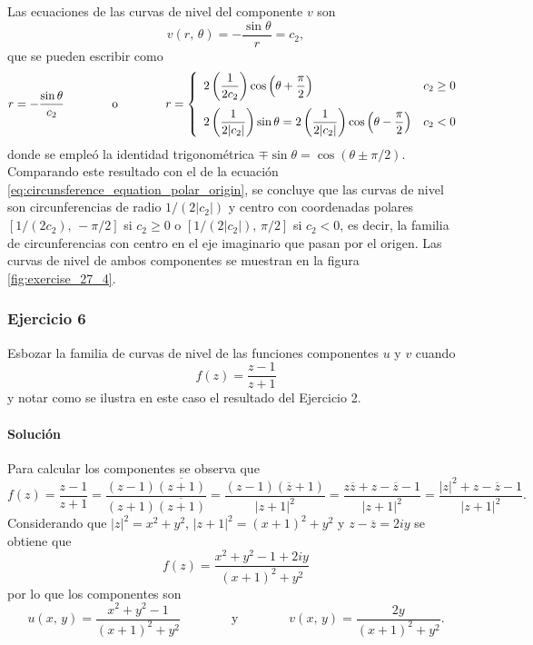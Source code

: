 \documentclass[a4paper]{report}
\begin{document}
Las ecuaciones de las curvas de nivel del componente \(v\) son
\[
 v(r,\,\theta)=-\frac{\sin\theta}{r}=c_2,
\]
que se pueden escribir como
\[
 r=-\frac{\sin\theta}{c_2}
 \qquad\qquad\textrm{o}\qquad\qquad
 r=\left\{ 
 \begin{array}{ll}
  2\left(\dfrac{1}{2c_2}\right)\cos\left(\theta+\dfrac{\pi}{2}\right) & c_2\geq0\\[\bigskipamount]
  2\left(\dfrac{1}{2|c_2|}\right)\sin\theta=2\left(\dfrac{1}{2|c_2|}\right)\cos\left(\theta-\dfrac{\pi}{2}\right) & c_2<0
 \end{array}
 \right.
\]
donde se empleó la identidad trigonométrica \(\mp\sin\theta=\cos(\theta\pm\pi/2)\). Comparando este resultado con el de la ecuación \ref{eq:circunsference_equation_polar_origin}, se concluye que las curvas de nivel son circunferencias de radio \(1/(2|c_2|)\) y centro con coordenadas polares \([1/(2c_2),\,-\pi/2]\) si \(c_2\geq0\) o \([1/(2|c_2|),\,\pi/2]\) si \(c_2<0\), es decir, la familia de circunferencias con centro en el eje imaginario que pasan por el origen. Las curvas de nivel de ambos componentes se muestran en la figura \ref{fig:exercise_27_4}.

\subsubsection{Ejercicio 6}

Esbozar la familia de curvas de nivel de las funciones componentes \(u\) y \(v\) cuando 
\[
 f(z)=\frac{z-1}{z+1}
\]
y notar como se ilustra en este caso el resultado del Ejercicio 2.

\paragraph{Solución} Para calcular los componentes se observa que 
\[
 f(z)=\frac{z-1}{z+1}=\frac{(z-1)\overline{(z+1)}}{(z+1)\overline{(z+1)}}
  =\frac{(z-1)(\overline{z}+1)}{|z+1|^2}
  =\frac{z\overline{z}+z-\overline{z}-1}{|z+1|^2}
  =\frac{|z|^2+z-\overline{z}-1}{|z+1|^2}.
\]
Considerando que \(|z|^2=x^2+y^2\), \(|z+1|^2=(x+1)^2+y^2\) y \(z-\overline{z}=2iy\) se obtiene que 
\[
 f(z)=\frac{x^2+y^2-1+2iy}{(x+1)^2+y^2}
\]
por lo que los componentes son
\[
 u(x,\,y)=\frac{x^2+y^2-1}{(x+1)^2+y^2}
 \qquad\qquad\textrm{y}\qquad\qquad
 v(x,\,y)=\frac{2y}{(x+1)^2+y^2}.
\]
\end{document}
